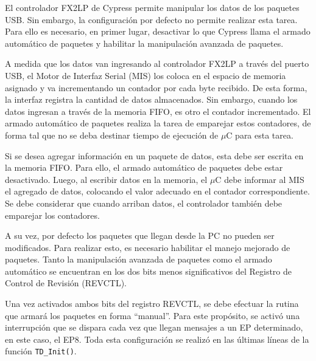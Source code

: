 	El controlador FX2LP de Cypress permite manipular los datos de los paquetes USB. Sin embargo, la configuración por defecto no permite realizar esta tarea. Para ello es necesario, en primer lugar, desactivar lo que Cypress llama el armado automático de paquetes y habilitar la manipulación avanzada de paquetes\cite{CypressSemiconductor2014fx2lp}.
	
	A medida que los datos van ingresando al controlador FX2LP a través del puerto USB, el Motor de Interfaz Serial (MIS) los coloca en el espacio de memoria asignado y va incrementando un contador por cada byte recibido. De esta forma, la interfaz registra la cantidad de datos almacenados. Sin embargo, cuando los datos ingresan a través de la memoria FIFO, es otro el contador incrementado. El armado automático de paquetes realiza la tarea de emparejar estos contadores, de forma tal que no se deba destinar tiempo de ejecución de $\mu$C para esta tarea. 
	
	Si se desea agregar información en un paquete de datos, esta debe ser escrita en la memoria FIFO. Para ello, el armado automático de paquetes debe estar desactivado. Luego, al escribir datos en la memoria, el $\mu$C debe informar al MIS el agregado de datos, colocando el valor adecuado en el contador correspondiente. Se debe considerar que cuando arriban datos, el controlador también debe emparejar los contadores.
	
	A su vez, por defecto los paquetes que llegan desde la PC no pueden ser modificados. Para realizar esto, es necesario habilitar el manejo mejorado de paquetes. Tanto la manipulación avanzada de paquetes como el armado automático se encuentran en los dos bits menos significativos del Registro de Control de Revisión (REVCTL).
	
	Una vez activados ambos bits del registro REVCTL, se debe efectuar la rutina que armará los paquetes en forma ``manual''. Para este propósito, se activó una interrupción que se dispara cada vez que llegan mensajes a un EP determinado, en este caso, el EP8. Toda esta configuración se realizó en las últimas líneas de la función \verb|TD_Init()|.
	
%	
